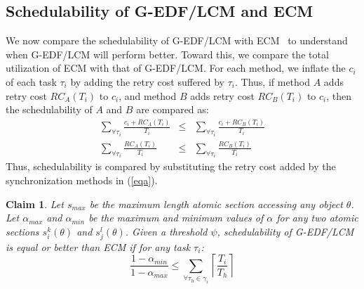 \documentclass[a4paper,english]{article}
\newtheorem{clm}{Claim}
\begin{document}
\subsection{Schedulability of G-EDF/LCM and ECM}
\label{performance g-edf-lcm}
We now compare the schedulability of G-EDF/LCM with ECM~\cite{stmconcurrencycontrol:emsoft11} %
to understand when G-EDF/LCM will perform better. 
Toward this, we compare the total utilization of ECM with that of G-EDF/LCM. For each method, we inflate the $c_i$ of each task $\tau_i$ by adding the retry cost suffered by $\tau_i$. Thus, if method $A$ adds retry cost $RC_A(T_i)$ to $c_i$, and method $B$ adds retry cost $RC_B(T_i)$ to $c_i$, then the schedulability of $A$ and $B$ are compared as:
\begin{eqnarray}
\sum_{\forall \tau_{i}}\frac{c_{i}+RC_A(T_{i})}{T_{i}} & \le & \sum_{\forall \tau_{i}}\frac{c_{i}+RC_B(T_{i})}{T_{i}}\nonumber\\
\sum_{\forall \tau_{i}}\frac{RC_A(T_{i})}{T_{i}} & \le & \sum_{\forall \tau_{i}}\frac{RC_B(T_{i})}{T_{i}}
\label{eqa}\end{eqnarray}
Thus, schedulability is compared by substituting the retry cost added by the synchronization methods in (\ref{eqa}).

\begin{clm}\label{lcm versus ecm}
Let $s_{max}$ be the maximum length atomic section accessing any object $\theta$. Let $\alpha_{max}$ and $\alpha_{min}$ be the maximum and minimum values of $\alpha$ for any two atomic sections $s_i^k(\theta)$ and $s_j^l(\theta)$. Given a threshold $\psi$, schedulability of G-EDF/LCM is equal or better than ECM if for any task $\tau_i$:
\begin{equation}
\frac{1-\alpha_{min}}{1-\alpha_{max}} \le \sum_{\forall \tau_h \in \gamma_i}\left\lceil\frac{T_i}{T_h}\right\rceil
\label{edf-lcm-ecm}\end{equation}
\end{clm}
\end{document}
